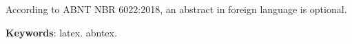    According to ABNT NBR 6022:2018, an abstract in foreign language is optional.

\vspace{\onelineskip}

\noindent
\textbf{Keywords}: latex. abntex.
